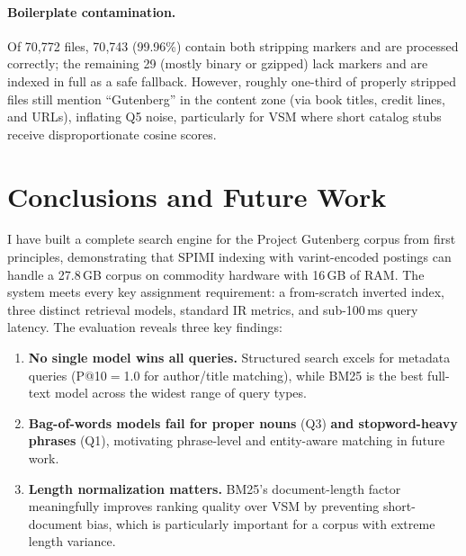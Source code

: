 \documentclass[sigconf,nonacm]{acmart}
\begin{document}
\paragraph{Boilerplate contamination.}
Of 70{,}772 files, 70{,}743 (99.96\%) contain both stripping markers and are
processed correctly; the remaining 29 (mostly binary or gzipped) lack markers
and are indexed in full as a safe fallback.  However, roughly one-third of
properly stripped files still mention ``Gutenberg'' in the content
zone (via book titles, credit lines, and URLs), inflating Q5 noise,
particularly for VSM where short catalog stubs receive disproportionate cosine
scores.

\section{Conclusions and Future Work}

I have built a complete search engine for the Project Gutenberg corpus from
first principles, demonstrating that SPIMI indexing with varint-encoded postings
can handle a 27.8\,GB corpus on commodity hardware with 16\,GB of RAM.
The system meets every key assignment requirement: a from-scratch inverted
index, three distinct retrieval models, standard IR metrics, and sub-100\,ms
query latency.  The evaluation reveals three key findings:
\begin{enumerate}[nosep]
  \item \textbf{No single model wins all queries.}  Structured search excels
        for metadata queries (P@10$=$1.0 for author/title matching), while
        BM25 is the best full-text model across the widest range of query types.
  \item \textbf{Bag-of-words models fail for proper nouns} (Q3)
        \textbf{and stopword-heavy phrases} (Q1), motivating
        phrase-level and entity-aware matching in future work.
  \item \textbf{Length normalization matters.}  BM25's
        document-length factor meaningfully improves ranking quality
        over VSM by preventing short-document bias, which is
        particularly important for a corpus with extreme length
        variance.
\end{enumerate}
\end{document}
